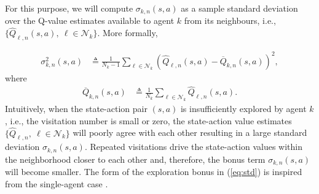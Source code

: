 \documentclass[lettersize,journal]{IEEEtran}
\begin{document}
 For this purpose, we will compute  $\sigma_{k,n}(s,a)$ as a sample standard deviation over the Q-value estimates available to agent $k$ from its neighbours, i.e., $\{\widehat{Q}_{\ell,n}(s,a),\ \ell \in\mathcal{N}_k\}$. More formally,  
 
\begin{align}
\label{eq:std}
\sigma_{k,n}^2 (s,a)& \triangleq \frac{1}{N_k-1} \sum_{\ell\in \mathcal{N}_k}\left(\widehat{Q}_{\ell,n}(s,a)-\overline{Q}_{k,n}(s,a)\right)^{2}, 
\end{align}
where 
\begin{align}
    \overline{Q}_{k,n}(s,a)& \triangleq \frac{1}{N_k}\sum\limits_{\ell\in \mathcal{N}_k}\widehat{Q}_{\ell, n}(s,a).\nonumber
\end{align}
Intuitively, when the state-action pair $(s,a)$ is insufficiently explored by agent $k$, i.e., the visitation number is small or zero, the state-action value estimates $\{\widehat{Q}_{\ell,n},\ \ell\in \mathcal{N}_k\}$ will poorly agree with each other resulting in a large standard deviation $\sigma_{k,n} (s,a)$.  %
Repeated visitations drive the state-action values within the neighborhood closer to each other and, therefore, the bonus term $\sigma_{k,n}(s,a)$ will become smaller. 
The form of the exploration bonus in (\ref{eq:std}) is inspired from the single-agent case \cite{TDU}.
 
\end{document}
